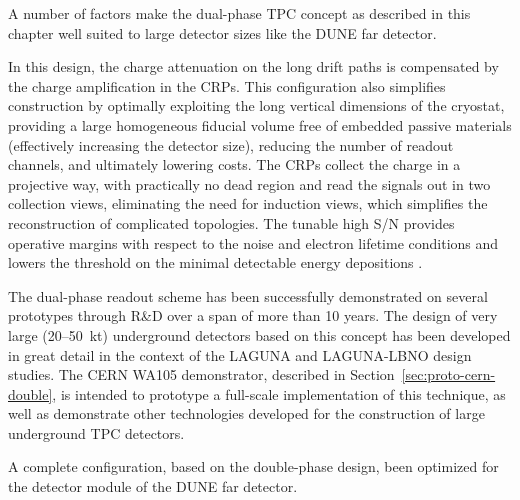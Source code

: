 A number of factors make the dual-phase TPC concept as described in this chapter 
well suited to large detector sizes like the DUNE far detector.

In this design, the charge attenuation on the long drift paths is compensated by the
charge amplification in the CRPs.  This configuration also simplifies
construction by optimally exploiting the long vertical dimensions of
the cryostat, providing a large homogeneous fiducial volume 
free of embedded passive materials (effectively increasing the detector size),
reducing the number of readout channels,  and ultimately lowering costs.  
The CRPs collect the charge in a projective way,  with practically no dead region and read the signals out 
in two collection views, eliminating the need for  induction views, which 
simplifies the reconstruction of complicated topologies. The tunable high S/N provides operative margins
with respect to the noise and electron lifetime conditions and lowers the threshold on the minimal
detectable energy depositions .

The dual-phase readout scheme has been successfully demonstrated on
several prototypes through R\&D over a span of more than 10 years.  The
design of very large (20--50~kt) underground detectors based on this
concept has been developed in great detail in the context of the
LAGUNA and LAGUNA-LBNO design studies.  The CERN WA105 demonstrator, 
described in Section~\ref{sec:proto-cern-double}, is intended to prototype 
a full-scale implementation of this technique, as
well as demonstrate other technologies developed for the construction of large
underground TPC detectors.  

 A complete configuration, based on the double-phase design, been optimized for the 
detector module of the DUNE far detector.
